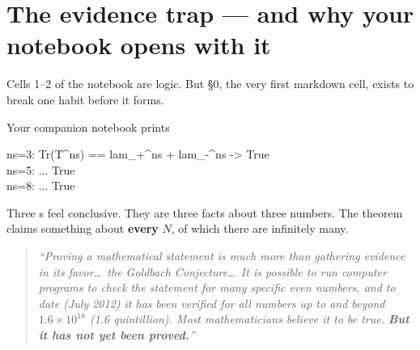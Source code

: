 \clearpage
\renewcommand{\sectioncolor}{alert}
\section{The evidence trap --- and why your notebook opens with it}

Cells 1--2 of the notebook are logic. But §0, the very first markdown cell, exists to break one
habit before it forms.

\begin{warnbox}[title={The habit: mistaking verification for proof}]
Your companion notebook prints
\begin{cellbox}
ns=3:  Tr(T\^{}ns) == lam\_+\^{}ns + lam\_-\^{}ns  ->  True\\
ns=5:  ...  True\\
ns=8:  ...  True
\end{cellbox}
\vspace{4pt}
Three s feel conclusive. They are three facts about three numbers. The theorem claims
something about \textbf{every} $N$, of which there are infinitely many.
\end{warnbox}

\begin{bookbox}[title={Devlin's killer example, §3.1 --- read this before you ever trust a pattern}]
\begin{quote}\itshape
``Proving a mathematical statement is much more than gathering evidence in its favor\ldots\ the
Goldbach Conjecture\ldots\ It is possible to run computer programs to check the statement for many
specific even numbers, and to date (July 2012) it has been verified for all numbers up to and beyond
$1.6\times10^{18}$ (1.6 quintillion). Most mathematicians believe it to be true. \textbf{But it has
not yet been proved.}''
\end{quote}
\end{bookbox}

\begin{center}
\end{center}
\vspace{10pt}

